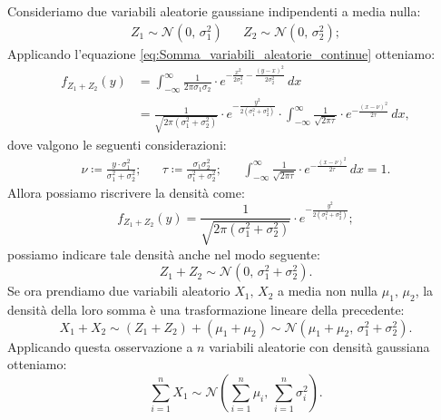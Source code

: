         \begin{obsv}\label{obsv:Somma_gaussiane_indipendenti}
            Consideriamo due variabili aleatorie gaussiane indipendenti a media nulla:
            \begin{align*}
                Z_1 \sim \mathcal{N}(0,\, \sigma^2_1) & & Z_2 \sim \mathcal{N}(0,\, \sigma^2_2)
            ;\end{align*}
            Applicando l'equazione \eqref{eq:Somma_variabili_aleatorie_continue} otteniamo:
            \begin{align*}
                f_{Z_1+Z_2}(y) &= \int_{-\infty}^{\infty} \frac{1}{2\pi \sigma_1 \sigma_2} \cdot e^{-\frac{x^2}{2\sigma_1^2}-\frac{(y-x)^2}{2\sigma_2^2}}\, dx \\
                               &= \frac{1}{\sqrt{2\pi(\sigma_1^2 + \sigma_2^2)}} \cdot e^{-\frac{y^2}{2(\sigma_1^2 + \sigma_2^2)}} \cdot \int_{-\infty}^{\infty} \frac{1}{\sqrt{2\pi \tau}}\cdot e^{-\frac{(x-\nu)^2}{2\tau}}\, dx
            ,\end{align*}
            dove valgono le seguenti considerazioni:
            \begin{align*}
                \nu \coloneqq \frac{y \cdot \sigma_1^2}{\sigma_1^2 + \sigma_2^2}; & &
                \tau \coloneqq \frac{\sigma_1^ \cdot \sigma_2^2}{\sigma_1^2 + \sigma_2^2}; & &
                \int_{-\infty}^{\infty} \frac{1}{\sqrt{2\pi \tau}}\cdot e^{-\frac{(x-\nu)^2}{2\tau}}\, dx = 1
            .\end{align*}
            Allora possiamo riscrivere la densità come: \[
                f_{Z_1+Z_2}(y) = \frac{1}{\sqrt{2\pi (\sigma_1^2 + \sigma_2^2)}} \cdot e^{-\frac{y^2}{2(\sigma_1^2 + \sigma_2^2)}}
            ;\] possiamo indicare tale densità anche nel modo seguente: \[
            Z_1 + Z_2 \sim \mathcal{N}(0,\, \sigma_1^2 + \sigma_2^2)
            .\] Se ora prendiamo due variabili aleatorio $X_1,\,X_2$ a media non nulla $\mu_1,\,\mu_2$, la densità della loro somma è una trasformazione lineare della precedente: \[
            X_1 + X_2 \sim (Z_1 + Z_2) + (\mu_1 + \mu_2) \sim \mathcal{N}(\mu_1 + \mu_2,\, \sigma_1^2 + \sigma_2^2)
            .\] Applicando questa osservazione a $n$ variabili aleatorie con densità gaussiana otteniamo:
            \begin{equation*}
                \sum_{i=1}^{n} X_1 \sim \mathcal{N}\left(\sum_{i=1}^{n} \mu_i,\, \sum_{i=1}^{n} \sigma_i^2\right)
            .\end{equation*}
        \end{obsv}
